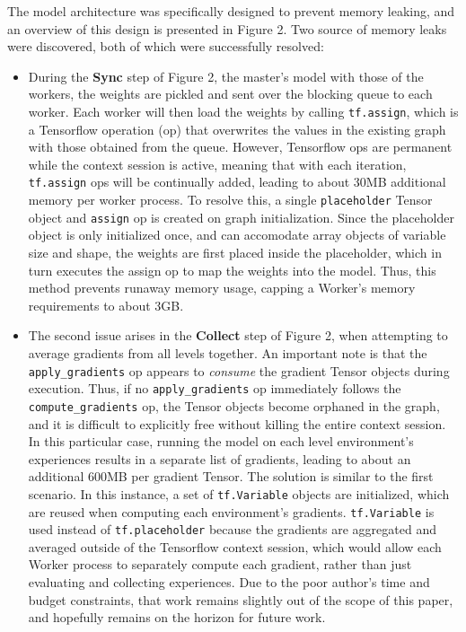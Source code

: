 \documentclass{article}
\begin{document}
The model architecture was specifically designed to prevent memory leaking, and an overview of this design is presented in Figure 2. Two source of memory leaks were discovered, both of which were successfully resolved:
\begin{itemize}
  \item During the \textbf{Sync} step of Figure 2, the master's model with those of the workers, the weights are pickled and sent over the blocking queue to each worker. Each worker will then load the weights by calling \texttt{tf.assign}, which is a Tensorflow operation (op) that overwrites the values in the existing graph with those obtained from the queue. However, Tensorflow ops are permanent while the context session is active, meaning that with each iteration, \texttt{tf.assign} ops will be continually added, leading to about 30MB additional memory per worker process.
    \subitem To resolve this, a single \texttt{placeholder} Tensor object and \texttt{assign} op is created on graph initialization. Since the placeholder object is only initialized once, and can accomodate array objects of variable size and shape, the weights are first placed inside the placeholder, which in turn executes the assign op to map the weights into the model. Thus, this method prevents runaway memory usage, capping a Worker's memory requirements to about 3GB.
  \item The second issue arises in the \textbf{Collect} step of Figure 2, when attempting to average gradients from all levels together. An important note is that the \texttt{apply\_gradients} op appears to \textit{consume} the gradient Tensor objects during execution. Thus, if no \texttt{apply\_gradients} op immediately follows the \texttt{compute\_gradients} op, the Tensor objects become orphaned in the graph, and it is difficult to explicitly free without killing the entire context session. In this particular case, running the model on each level environment's experiences results in a separate list of gradients, leading to about an additional 600MB per gradient Tensor.
    \subitem The solution is similar to the first scenario. In this instance, a set of \texttt{tf.Variable} objects are initialized, which are reused when computing each environment's gradients. \texttt{tf.Variable} is used instead of \texttt{tf.placeholder} because the gradients are aggregated and averaged outside of the Tensorflow context session, which would allow each Worker process to separately compute each gradient, rather than just evaluating and collecting experiences. Due to the poor author's time and budget constraints, that work remains slightly out of the scope of this paper, and hopefully remains on the horizon for future work.
\end{itemize}
\end{document}
